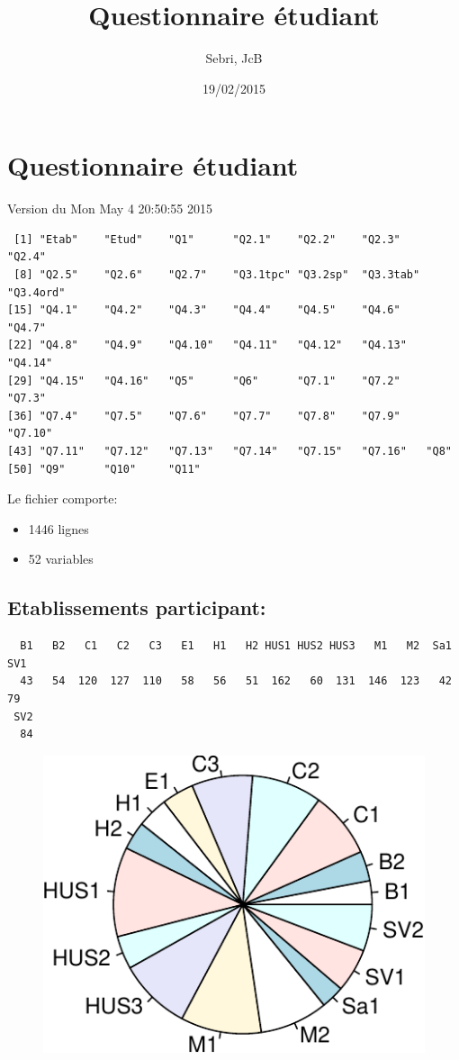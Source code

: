 \documentclass[]{article}
\title{Questionnaire étudiant}
\author{Sebri, JcB}
\date{19/02/2015}
\begin{document}
\maketitle


{
\hypersetup{linkcolor=black}
\setcounter{tocdepth}{2}
\tableofcontents
}
\section{Questionnaire étudiant}\label{questionnaire-etudiant}

Version du Mon May 4 20:50:55 2015

\begin{verbatim}
 [1] "Etab"    "Etud"    "Q1"      "Q2.1"    "Q2.2"    "Q2.3"    "Q2.4"   
 [8] "Q2.5"    "Q2.6"    "Q2.7"    "Q3.1tpc" "Q3.2sp"  "Q3.3tab" "Q3.4ord"
[15] "Q4.1"    "Q4.2"    "Q4.3"    "Q4.4"    "Q4.5"    "Q4.6"    "Q4.7"   
[22] "Q4.8"    "Q4.9"    "Q4.10"   "Q4.11"   "Q4.12"   "Q4.13"   "Q4.14"  
[29] "Q4.15"   "Q4.16"   "Q5"      "Q6"      "Q7.1"    "Q7.2"    "Q7.3"   
[36] "Q7.4"    "Q7.5"    "Q7.6"    "Q7.7"    "Q7.8"    "Q7.9"    "Q7.10"  
[43] "Q7.11"   "Q7.12"   "Q7.13"   "Q7.14"   "Q7.15"   "Q7.16"   "Q8"     
[50] "Q9"      "Q10"     "Q11"    
\end{verbatim}

Le fichier comporte:

\begin{itemize}
\itemsep1pt\parskip0pt
\item
  1446 lignes
\item
  52 variables
\end{itemize}

\subsection{Etablissements
participant:}\label{etablissements-participant}

\begin{verbatim}
  B1   B2   C1   C2   C3   E1   H1   H2 HUS1 HUS2 HUS3   M1   M2  Sa1  SV1 
  43   54  120  127  110   58   56   51  162   60  131  146  123   42   79 
 SV2 
  84 
\end{verbatim}

\begin{figure}[htbp]
\centering
\includegraphics{qs_etudiants_files/figure-latex/participants-1.pdf}
\end{figure}
\end{document}
